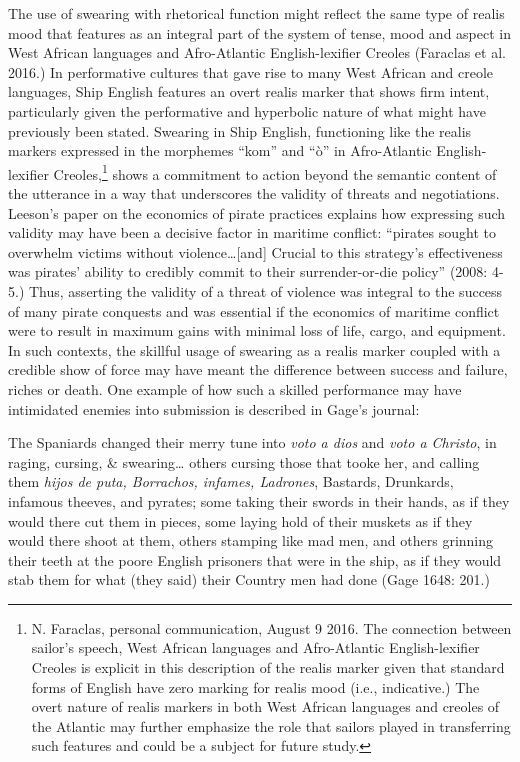 \begin{styleStandard}
The use of swearing with rhetorical function might reflect the same type of realis mood that features as an integral part of the system of tense, mood and aspect in West African languages and Afro-Atlantic English-lexifier Creoles (Faraclas et al. 2016.) In performative cultures that gave rise to many West African and creole languages, Ship English features an overt realis marker that shows firm intent, particularly given the performative and hyperbolic nature of what might have previously been stated. Swearing in Ship English, functioning like the realis markers expressed in the morphemes “kom” and “ò” in Afro-Atlantic English-lexifier Creoles,\footnote{ N. Faraclas, personal communication, August 9 2016. The connection between sailor’s speech, West African languages and Afro-Atlantic English-lexifier Creoles is explicit in this description of the realis marker given that standard forms of English have zero marking for realis mood (i.e., indicative.) The overt nature of realis markers in both West African languages and creoles of the Atlantic may further emphasize the role that sailors played in transferring such features and could be a subject for future study.} shows a commitment to action beyond the semantic content of the utterance in a way that underscores the validity of threats and negotiations. Leeson’s paper on the economics of pirate practices explains how expressing such validity may have been a decisive factor in maritime conflict: “pirates sought to overwhelm victims without violence…[and] Crucial to this strategy’s effectiveness was pirates’ ability to credibly commit to their surrender-or-die policy” (2008: 4-5.) Thus, asserting the validity of a threat of violence was integral to the success of many pirate conquests and was essential if the economics of maritime conflict were to result in maximum gains with minimal loss of life, cargo, and equipment. In such contexts, the skillful usage of swearing as a realis marker coupled with a credible show of force may have meant the difference between success and failure, riches or death. One example of how such a skilled performance may have intimidated enemies into submission is described in Gage’s journal:
\end{styleStandard}

\begin{styleStandard}
The Spaniards changed their merry tune into \textit{voto a dios} and \textit{voto a Christo}, in raging, cursing, \& swearing… others cursing those that tooke her, and calling them \textit{hijos de puta, Borrachos, infames, Ladrones}, Bastards, Drunkards, infamous theeves, and pyrates; some taking their swords in their hands, as if they would there cut them in pieces, some laying hold of their muskets as if they would there shoot at them, others stamping like mad men, and others grinning their teeth at the poore English prisoners that were in the ship, as if they would stab them for what (they said) their Country men had done (Gage 1648: 201.)
\end{styleStandard}

